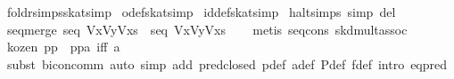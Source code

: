 \begin{isabellebody}
\isamarkupfalse%
\ foldr{}simps{}skat{}simp{}\isanewline
{}\isamarkupfalse%
\ o{}def{}skat{}simp{}\isanewline
{}\isamarkupfalse%
\ id{}def{}skat{}simp{}\isanewline
{}\isamarkupfalse%
\ halt{}simps{}{}{}\ {}simp\ del{}\isanewline
\isanewline
{}\isamarkupfalse%
\ seq{}merge{}\ {}seq\ {}Vx{}Vy{}Vxs{}\ {}\ seq\ {}Vx{}Vy{}Vxs{}{}\isanewline
%
\isadelimproof
\ \ %
\endisadelimproof
%
\isatagproof
{}\isamarkupfalse%
\ {}metis\ seq{}cons\ skd{}mult{}assoc{}%
\endisatagproof
{\isafoldproof}%
%
\isadelimproof
\isanewline
%
\endisadelimproof
\isanewline
{}\isamarkupfalse%
\ kozen{}{}\ {}p{}{}{}p{}{}\ {}\ p{}{}{}p{}{}{}{}a{}\ iff\ a{}{}{}\isanewline
%
\isadelimproof
\ \ %
\endisadelimproof
%
\isatagproof
{}\isamarkupfalse%
\ {}subst\ bicon{}comm{}\ {}auto\ simp\ add{}\ pred{}closed\ p{}def\ a{}def\ P{}def\ f{}def\ intro{}\ eq{}pred{}%

\end{isabellebody}
